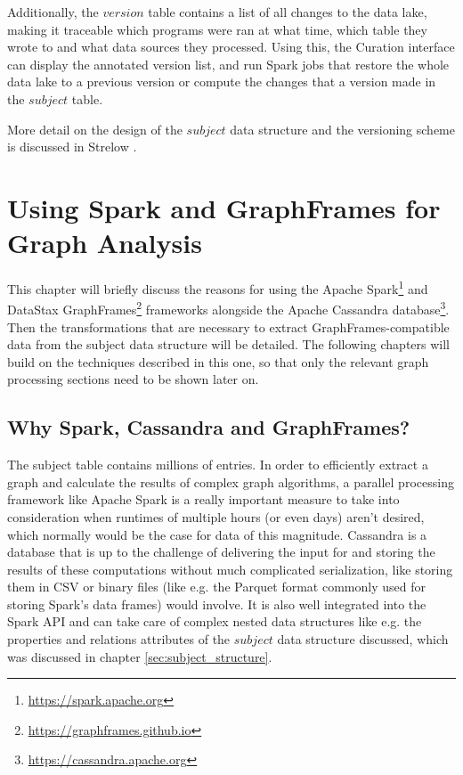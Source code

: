 \documentclass[
        a4paper,     %
        titlepage,   %
        oneside,     %
        parskip      %
]{scrartcl}          %
\begin{document}
    Additionally, the $version$ table contains a list of all changes to the data lake,
    making it traceable which programs were ran at what time, which table they wrote
    to and what data sources they processed. Using this, the Curation interface
    can display the annotated version list, and run Spark jobs that restore the
    whole data lake to a previous version or compute the changes that a version
    made in the $subject$ table.

    More detail on the design of the $subject$ data structure and the versioning
    scheme is discussed in Strelow \cite{strelow}.
    \pagebreak

  \section{Using Spark and GraphFrames for Graph Analysis}
  This chapter will briefly discuss the reasons for using the
  Apache Spark\footnote{\url{https://spark.apache.org}}
  and DataStax GraphFrames\footnote{\url{https://graphframes.github.io}}
  frameworks alongside the
  Apache Cassandra database\footnote{\url{https://cassandra.apache.org}}.
  Then the transformations that are necessary to extract GraphFrames-compatible
  data from the subject data structure will be detailed.
  The following chapters will build on the techniques described in this one, so
  that only the relevant graph processing sections need to be shown later on.

    \subsection{Why Spark, Cassandra and GraphFrames?}
    The subject table contains millions of entries. In order to efficiently extract
    a graph and calculate the results of complex graph algorithms, a parallel processing
    framework like Apache Spark is a really important measure to take into consideration when runtimes
    of multiple hours (or even days) aren't desired, which normally would be the case for data of this magnitude.
    Cassandra is a database that is up to the challenge of delivering the input for and storing the results of
    these computations without much complicated serialization, like storing them
    in CSV or binary files (like e.g. the Parquet format commonly used for storing Spark's data frames) would involve.
    It is also well integrated into the Spark API and can take care of complex nested
    data structures like e.g. the properties and relations attributes of the $subject$
    data structure discussed, which was discussed in chapter \ref{sec:subject_structure}.
\end{document}
